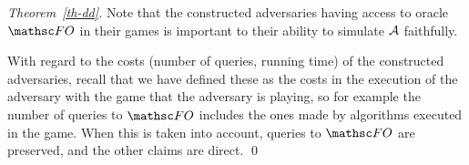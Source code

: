 \begin{proof}[Theorem~\ref{th-dd}]
Note that the constructed adversaries having access to oracle $\HASH$ in their games is important to their ability to simulate $\mathcal{A}$ faithfully. 

With regard to the costs (number of queries, running time) of the constructed adversaries, recall that we have defined these as the costs in the execution of the adversary with the game that the adversary is playing, so for example the number of queries to $\HASH$ includes the ones made by algorithms executed in the game. When this is taken into account, queries to $\HASH$ are preserved, and the other claims are direct.
\qed
\end{proof}



